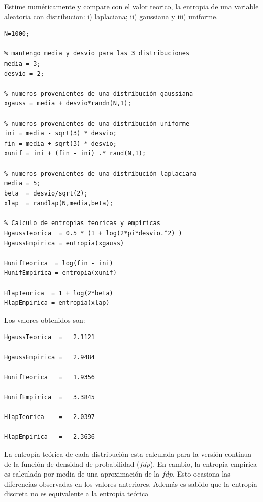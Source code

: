 \documentclass[11pt,a4paper,final]{article}
\begin{document}
Estime numéricamente y compare con el valor teorico, la entropia de una variable aleatoria con distribucion: i) laplaciana; ii) gaussiana y iii) uniforme.

\begin{verbatim}
N=1000;

% mantengo media y desvio para las 3 distribuciones
media = 3;
desvio = 2;

% numeros provenientes de una distribución gaussiana
xgauss = media + desvio*randn(N,1);

% numeros provenientes de una distribución uniforme
ini = media - sqrt(3) * desvio;
fin = media + sqrt(3) * desvio;
xunif = ini + (fin - ini) .* rand(N,1);

% numeros provenientes de una distribución laplaciana
media = 5;
beta  = desvio/sqrt(2);
xlap  = randlap(N,media,beta);

% Calculo de entropias teoricas y empíricas
HgaussTeorica  = 0.5 * (1 + log(2*pi*desvio.^2) )
HgaussEmpirica = entropia(xgauss)

HunifTeorica  = log(fin - ini)
HunifEmpirica = entropia(xunif)

HlapTeorica  = 1 + log(2*beta)
HlapEmpirica = entropia(xlap)
\end{verbatim}

Los valores obtenidos son:
\begin{verbatim}
HgaussTeorica  =   2.1121

HgaussEmpirica =   2.9484

HunifTeorica   =   1.9356

HunifEmpirica  =   3.3845

HlapTeorica    =   2.0397

HlapEmpirica   =   2.3636
\end{verbatim}
    
La entropía teórica de cada distribución esta calculada para la versión continua de la función de densidad de probabilidad ($fdp$). En cambio, la entropía empirica es calculada por media de una aproximación de la $fdp$. Esto ocasiona las diferencias observadas en los valores anteriores. Además es sabido que la entropía discreta no es equivalente a la entropía teórica
\end{document}
